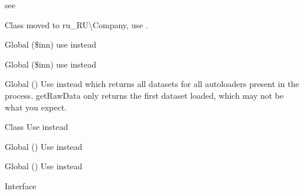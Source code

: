 \begin{DoxyRefList}
%
see   
\item[Class \doxylink{class_faker_1_1_calculator_1_1_inn}{Inn} ]\label{deprecated__deprecated000004}%
%
moved to ru\+\_\+\+RU\textbackslash{}\+Company, use {\ttfamily {}}.  
\item[Global \doxylink{class_faker_1_1_calculator_1_1_inn_ac2c2403ad7e822e981c57ba9c1e0ff5d}{Inn\+::checksum} (\$inn)]\label{deprecated__deprecated000005}%
%
use {\ttfamily \doxylink{}{()}} instead  
\item[Global \doxylink{class_faker_1_1_calculator_1_1_inn_ac769a9128170756ba3491801d579cd97}{Inn\+::is\+Valid} (\$inn)]\label{deprecated__deprecated000006}%
%
use {\ttfamily \doxylink{}{()}} instead  
\item[Global \doxylink{class_composer_1_1_installed_versions_a6ecee8643c03c515b55686f03d117665}{Installed\+Versions\+::get\+Raw\+Data} ()]\label{deprecated__deprecated000001}%
%
Use  instead which returns all datasets for all autoloaders present in the process. get\+Raw\+Data only returns the first dataset loaded, which may not be what you expect.  
\item[Class \doxylink{class_faker_1_1_provider_1_1zh___t_w_1_1_internet}{Internet} ]\label{deprecated__deprecated000022}%
%
Use {\ttfamily {}} instead  
\item[Global \doxylink{class_faker_1_1_provider_1_1zh___t_w_1_1_internet_a15373742a8411f9b23873e27e64d2d5b}{Internet\+::domain\+Word} ()]\label{deprecated__deprecated000024}%
%
Use {\ttfamily \doxylink{}{()}} instead  
\item[Global \doxylink{class_faker_1_1_provider_1_1zh___t_w_1_1_internet_ae08413c329b142d00f90d6c99b350755}{Internet\+::user\+Name} ()]\label{deprecated__deprecated000023}%
%
Use {\ttfamily \doxylink{}{()}} instead  
\item[Interface \doxylink{interface_illuminate_1_1_contracts_1_1_validation_1_1_invokable_rule}{Invokable\+Rule} ]\label{deprecated__deprecated000052}%

\end{DoxyRefList}
